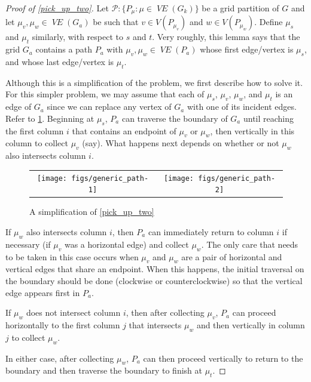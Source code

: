\documentclass{patmorin}
\DeclareMathOperator{\VE}{\mathit{VE}}
\begin{document}
\begin{proof}[Proof of \cref{pick_up_two}]
  Let $\mathcal{P}:\{P_\mu:\mu\in \VE(G_k)\}$ be a grid partition of $G$ and let $\mu_v,\mu_w\in \VE(G_a)$ be such that $v\in V(P_{\mu_v})$ and $w\in V(P_{\mu_w})$.  Define $\mu_s$ and $\mu_t$ similarly, with respect to $s$ and $t$.  Very roughly, this lemma says that the grid $G_a$ contains a path $P_a$ with $\mu_v,\mu_w\in\VE(P_a)$ whose first edge/vertex is $\mu_s$, and whose last edge/vertex is $\mu_t$.

  Although this is a simplification of the problem, we first describe how to solve it.  For this simpler problem, we may assume that each of $\mu_s$, $\mu_v$, $\mu_w$, and $\mu_t$ is an edge of $G_a$ since we can replace any vertex of $G_a$ with one of its incident edges. Refer to \cref{generic_path}. Beginning at $\mu_s$, $P_a$ can traverse the boundary of $G_a$ until reaching the first column $i$ that contains an endpoint of $\mu_v$ or $\mu_w$, then vertically in this column to collect $\mu_v$ (say). What happens next depends on whether or not $\mu_w$ also intersects column $i$.
  \begin{figure}[htbp]
    \begin{center}
      \begin{tabular}{cc}
        \texttt{[image: figs/generic\_path-1]} &
        \texttt{[image: figs/generic\_path-2]}
      \end{tabular}
    \end{center}
    \caption{A simplification of \cref{pick_up_two}}
    \label{generic_path}
  \end{figure}
  \begin{compactitem}
    \item If $\mu_w$ also intersects column $i$, then $P_a$ can immediately return to column $i$ if necessary (if $\mu_v$ was a horizontal edge) and collect $\mu_w$. The only care that needs to be taken in this case occurs when $\mu_v$ and $\mu_w$ are a pair of horizontal and vertical edges that share an endpoint.  When this happens, the initial traversal on the boundary should be done (clockwise or counterclockwise) so that the vertical edge appears first in $P_a$.

    \item If $\mu_w$ does not intersect column $i$, then after collecting $\mu_v$, $P_a$ can proceed horizontally to the first column $j$ that intersects $\mu_w$ and then vertically in column $j$ to collect $\mu_w$.
  \end{compactitem}
  In either case, after collecting $\mu_w$, $P_a$ can then proceed vertically to return to the boundary and then traverse the boundary to finish at $\mu_t$.


\end{proof}
\end{document}
